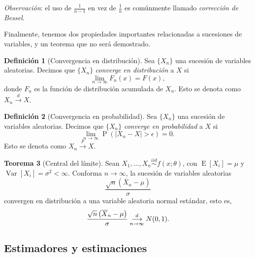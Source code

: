 \documentclass[11pt,letterpaper]{article}
\newcommand{\prob}{\ensuremath{\operatorname{P}}}
\newcommand{\expected}{\ensuremath{\operatorname{E}}}
\newcommand{\variance}{\ensuremath{\operatorname{Var}}}
\theoremstyle{definition}
\newtheorem{definition}{Definición}[section]
\theoremstyle{theorem}
\newtheorem{theorem}[definition]{Teorema}
\theoremstyle{remark}
\begin{document}
	\noindent\textit{Observación}: el uso de \(\frac{1}{n-1}\) en vez de \(\frac{1}{n}\) es comúnmente llamado \textit{corrección de Bessel}. \par
	Finalmente, tenemos dos propiedades importantes relacionadas a sucesiones de variables, y un teorema que no será demostrado.
	\begin{definition}[Convergencia en distribución]
		Sea \(\{X_n\}\) una sucesión de variables aleatorias. Decimos que \(\{X_n\}\) \textit{converge en distribución} a \(X\) si
		\[\lim_{n\to\infty}F_n(x)=F(x),\]
		donde \(F_n\) es la función de distribución acumulada de \(X_n\). Esto se denota como \(X_n\overset{d}{\longrightarrow}X\).
	\end{definition}
	\begin{definition}[Convergencia en probabilidad]
		Sea \(\{X_n\}\) una sucesión de variables aleatorias. Decimos que \(\{X_n\}\) \textit{converge en probabilidad} a \(X\) si
		\[\lim_{n\to\infty}\prob(|X_n-X|>\epsilon)=0.\]
		Esto se denota como \(X_n\overset{p}{\longrightarrow}X\).
	\end{definition}
	\begin{theorem}[Central del límite] \label{tcl}
		Sean \(X_1,\dots,X_n\overset{iid}{\sim}f(x;\theta)\), con \(\expected[X_i]=\mu\) y \(\variance[X_i]=\sigma^2<\infty\). Conforma \(n\to\infty\), la sucesión de variables aleatorias \[\frac{\sqrt{n}\left(\overline{X}_n- \mu\right)}{\sigma}\]
		convergen en distribución a una variable aleatoria normal estándar, esto es,
		\[\frac{\sqrt{n}\left(\overline{X}_n-\mu\right)}{\sigma}\overunderset{d}{n\to\infty}{\longrightarrow}N(0,1).\]
	\end{theorem}
	\subsection{Estimadores y estimaciones}
\end{document}
